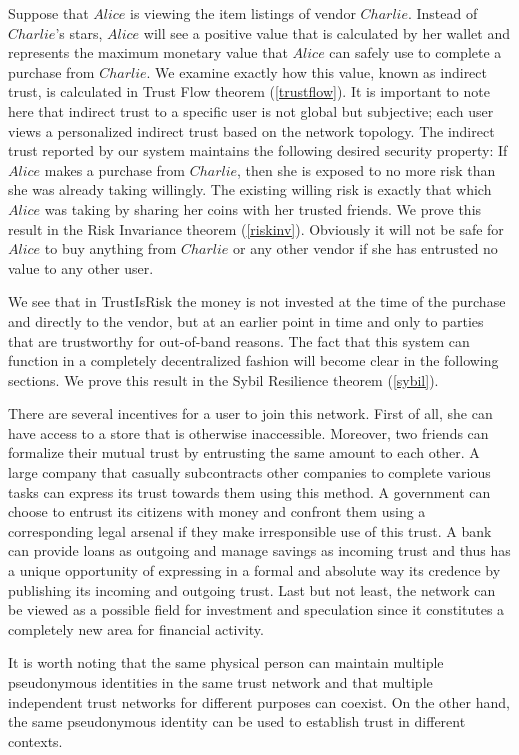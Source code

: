    Suppose that $Alice$ is viewing the item listings of vendor $Charlie$. Instead of $Charlie$'s stars, $Alice$ will see a
   positive value that is calculated by her wallet and represents the maximum monetary value that $Alice$ can safely use to
   complete a purchase from $Charlie$. We examine exactly how this value, known as indirect trust, is calculated in Trust
   Flow theorem (\ref{trustflow}). It is important to note here that indirect trust to a specific user is not global but
   subjective; each user views a personalized indirect trust based on the network topology. The indirect trust reported by
   our system maintains the following desired security property: If $Alice$ makes a purchase from $Charlie$, then she is
   exposed to no more risk than she was already taking willingly. The existing willing risk is exactly that which $Alice$
   was taking by sharing her coins with her trusted friends. We prove this result in the Risk Invariance theorem
   (\ref{riskinv}). Obviously it will not be safe for $Alice$ to buy anything from $Charlie$ or any other vendor if she has
   entrusted no value to any other user.

   We see that in TrustIsRisk the money is not invested at the time of the purchase and directly to the vendor, but at an
   earlier point in time and only to parties that are trustworthy for out-of-band reasons. The fact that this system can
   function in a completely decentralized fashion will become clear in the following sections. We prove this result in the
   Sybil Resilience theorem (\ref{sybil}).

   There are several incentives for a user to join this network. First of all, she can have access to a store that is
   otherwise inaccessible. Moreover, two friends can formalize their mutual trust by entrusting the same amount to each
   other. A large company that casually subcontracts other companies to complete various tasks can express its trust
   towards them using this method. A government can choose to entrust its citizens with money and confront them using a
   corresponding legal arsenal if they make irresponsible use of this trust. A bank can provide loans as outgoing and
   manage savings as incoming trust and thus has a unique opportunity of expressing in a formal and absolute way its
   credence by publishing its incoming and outgoing trust. Last but not least, the network can be viewed as a possible
   field for investment and speculation since it constitutes a completely new area for financial activity.

   It is worth noting that the same physical person can maintain multiple pseudonymous identities in the same trust network
   and that multiple independent trust networks for different purposes can coexist. On the other hand, the same
   pseudonymous identity can be used to establish trust in different contexts.
